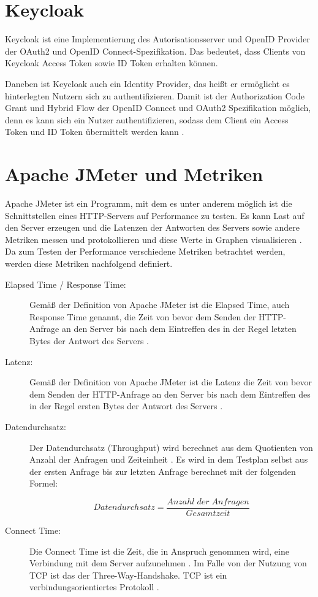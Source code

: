 \section{Keycloak}
Keycloak ist eine Implementierung des Autorisationsserver und OpenID Provider der 
OAuth2 und OpenID Connect-Spezifikation. Das bedeutet, dass Clients von Keycloak Access 
Token sowie ID Token erhalten können.\smallskip

Daneben ist Keycloak auch ein Identity Provider, das heißt er ermöglicht es hinterlegten 
Nutzern sich zu authentifizieren. Damit ist der Authorization Code Grant und 
Hybrid Flow der OpenID Connect und OAuth2 Spezifikation möglich, denn es kann sich ein 
Nutzer authentifizieren, sodass dem Client ein Access Token und ID Token übermittelt 
werden kann \citep{keycloak:2021}.

\section{Apache JMeter und Metriken}
\label{sec:ApacheJMeterundMetriken}
Apache JMeter ist ein Programm, mit dem es unter anderem möglich ist die Schnittstellen eines HTTP-Servers auf 
Performance zu testen. Es kann Last auf den Server erzeugen und die Latenzen der Antworten des Servers sowie andere Metriken messen und protokollieren und diese Werte in Graphen visualisieren \citep{jmeter:2021}.
Da zum Testen der Performance verschiedene Metriken betrachtet werden, werden diese 
Metriken nachfolgend definiert. 

\begin{description}
  \item[Elapsed Time / Response Time:] Gemäß der Definition von Apache JMeter ist die Elapsed Time, auch Response Time 
  genannt, die Zeit von bevor dem Senden der HTTP-Anfrage an den Server bis nach dem 
  Eintreffen des in der Regel letzten Bytes der Antwort des Servers \citep{jmeterglossary:2021}. 
  \item[Latenz:] Gemäß der Definition von Apache JMeter ist die Latenz die Zeit von bevor dem Senden der 
  HTTP-Anfrage an den Server bis nach dem Eintreffen des in der Regel ersten Bytes der 
  Antwort des Servers \citep{jmeterglossary:2021}. 
  \item[Datendurchsatz:] Der Datendurchsatz (Throughput) wird berechnet aus dem Quotienten von Anzahl der Anfragen 
  und Zeiteinheit \citep{jmeterglossary:2021}. Es wird in dem Testplan selbst aus der ersten Anfrage bis zur letzten 
  Anfrage berechnet mit der folgenden Formel:

  \begin{equation}
    Datendurchsatz = \frac{Anzahl\;der\;Anfragen}{Gesamtzeit} 
  \end{equation}

  \item[Connect Time:] Die Connect Time ist die Zeit, die in Anspruch genommen wird, eine Verbindung mit dem 
  Server aufzunehmen \citep{jmeterglossary:2021}. Im Falle von der Nutzung von \ac{TCP} ist das der Three-Way-Handshake. TCP ist ein verbindungsorientiertes Protokoll \citep{tcp:1981}.
\end{description}

